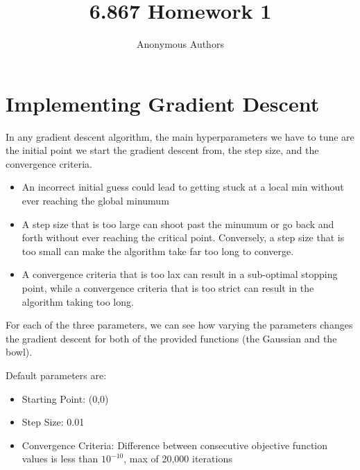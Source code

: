\documentclass{article}
\title{6.867 Homework 1}
\author{Anonymous Authors}
\begin{document}
\maketitle
\thispagestyle{fancy}

\section{Implementing Gradient Descent}

In any gradient descent algorithm, the main hyperparameters we have to tune are the initial point we start the gradient descent from, the step size, and the convergence criteria. 

\begin{itemize}

\item An incorrect initial guess could lead to getting stuck at a local min without ever reaching the global minumum
\item A step size that is too large can shoot past the minumum or go back and forth without ever reaching the critical point. Conversely, a step size that is too small can make the algorithm take far too long to converge.
\item A convergence criteria that is too lax can result in a sub-optimal stopping point, while a convergence criteria that is too strict can result in the algorithm taking too long.

\end{itemize}

For each of the three parameters, we can see how varying the parameters changes the gradient descent for both of the provided functions (the Gaussian and the bowl).

Default parameters are: 

\begin{itemize}

\item Starting Point: (0,0)
\item Step Size: 0.01
\item Convergence Criteria: Difference between consecutive objective function values is less than $10^{-10}$, max of 20,000 iterations
\end{itemize}
\end{document}
